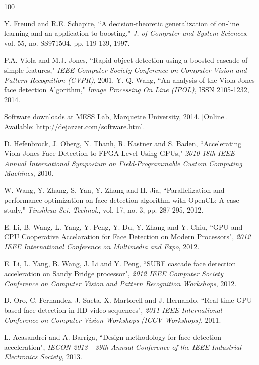 \documentclass[conference]{IEEEtran}
\begin{document}
\begin {thebibliography}{100}


Y. Freund and R.E. Schapire, ``A decision-theoretic generalization of on-line learning and an application to boosting," \emph{J. of Computer and System Sciences}, vol. 55, no. SS971504, pp. 119-139, 1997.

P.A. Viola and M.J. Jones, ``Rapid object detection using a boosted cascade of simple features," \emph{IEEE Computer Society Conference on Computer Vision and Pattern Recognition (CVPR)}, 2001.
Y.-Q. Wang, ``An analysis of the Viola-Jones face detection Algorithm," \emph{Image Processing On Line (IPOL)}, ISSN 2105-1232, 2014.

Software downloads at MESS Lab, Marquette University, 2014. [Online]. Available: \url{http://dejazzer.com/software.html}.

D.  Hefenbrock, J.  Oberg, N.  Thanh, R.  Kastner and S.  Baden, ``Accelerating Viola-Jones Face Detection to FPGA-Level Using GPUs," \emph{2010 18th IEEE Annual International Symposium on Field-Programmable Custom Computing Machines}, 2010.

W. Wang, Y. Zhang, S. Yan, Y. Zhang and H. Jia, ``Parallelization and performance optimization on face detection algorithm with OpenCL: A case study," \emph{Tinshhua Sci. Technol.}, vol. 17, no. 3, pp. 287-295, 2012.

E.  Li, B.  Wang, L.  Yang, Y.  Peng, Y.  Du, Y.  Zhang and Y.  Chiu, ``GPU and CPU Cooperative Accelaration for Face Detection on Modern Processors", \emph{2012 IEEE International Conference on Multimedia and Expo}, 2012.

E. Li, L. Yang, B. Wang, J. Li and Y. Peng, ``SURF cascade face detection acceleration on Sandy Bridge processor", \emph{2012 IEEE Computer Society Conference on Computer Vision and Pattern Recognition Workshops}, 2012.

D. Oro, C. Fernandez, J. Saeta, X. Martorell and J. Hernando, ``Real-time GPU-based face detection in HD video sequences", \emph{2011 IEEE International Conference on Computer Vision Workshops (ICCV Workshops)}, 2011.

L. Acasandrei and A. Barriga, ``Design methodology for face detection acceleration", \emph{IECON 2013 - 39th Annual Conference of the IEEE Industrial Electronics Society}, 2013.


\end{thebibliography}
\end{document}
